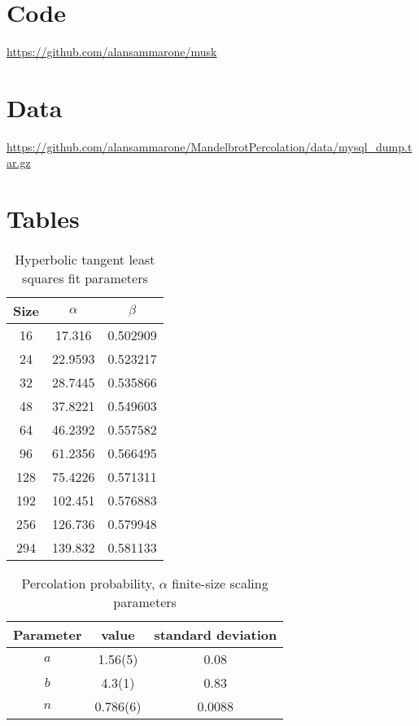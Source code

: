 \chapter{Code}
\url{https://github.com/alansammarone/musk}
\clearpage

\chapter{Data}
\url{https://github.com/alansammarone/MandelbrotPercolation/data/mysql_dump.tar.gz}
\clearpage
\chapter{Tables}
\begin{table}[H]
\begin{center}
    \begin{tabular}{||c | c |  c|| }
    \hline
      Size &   $\alpha$ &   $\beta$ \\
    \hline
      16 &    17.316  &  0.502909 \\
      24 &    22.9593 &  0.523217 \\
      32 &    28.7445 &  0.535866 \\
      48 &    37.8221 &  0.549603 \\
      64 &    46.2392 &  0.557582 \\
      96 &    61.2356 &  0.566495 \\
     128 &    75.4226 &  0.571311 \\
     192 &   102.451  &  0.576883 \\
     256 &   126.736  &  0.579948 \\
     294 &   139.832  &  0.581133 \\
    \hline
    \end{tabular}
\end{center}
\caption{Hyperbolic tangent least squares fit parameters}
\label{table:sec3_tahn_fit_parameters}
\end{table}



\begin{table}[H]
\begin{center}
    \begin{tabular}{||c |c| c|| }
    \hline
      Parameter &  value & standard deviation \\
    \hline
      $a$ &    1.56(5)  &  0.08 \\
      $b$ &    4.3(1) &  0.83 \\
      $n$ & 0.786(6) & 0.0088 \\
    \hline
    \end{tabular}
\end{center}
\caption{Percolation probability, $\alpha$ finite-size scaling parameters}
\label{table:pp_slope_finite_size_scaling_params}
\end{table}


